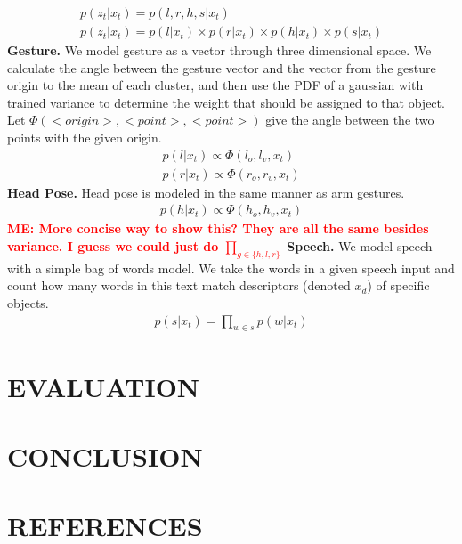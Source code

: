 \documentclass[letterpaper, 10 pt, conference]{ieeeconf}
\newcommand{\menote}[1]{\textcolor{Red}{\textbf{ME: #1}}}
\begin{document}
\begin{align}
p(z_t | x_t) = p(l, r, h, s | x_t)\\
p(z_t | x_t) = p(l | x_t) \times p(r | x_t) \times p(h | x_t) \times p(s | x_t)
\end{align}
{\bf Gesture.}  We model gesture as a vector through three dimensional space. We calculate the angle between the gesture vector and the vector from the gesture origin to the mean of each cluster, and then use the PDF of a gaussian with trained variance to determine the weight that should be assigned to that object. Let $\Phi(<origin>, <point>, <point>)$ give the angle between the two points with the given origin.
\begin{align}
p(l | x_t) \propto \Phi(l_o, l_v, x_t)\\
p(r | x_t) \propto \Phi(r_o, r_v, x_t)
\end{align}
{\bf Head Pose.}
Head pose is modeled in the same manner as arm gestures.
\begin{align}
p(h | x_t) \propto \Phi(h_o, h_v, x_t)
\end{align}
\menote{More concise way to show this? They are all the same besides variance. I guess we could just do $\prod_{g\in\{h,l,r\}}$}
{\bf Speech.}
We model speech with a simple bag of words model. We take the words in a given speech input and count how many words in this text match descriptors (denoted  $x_d$) of specific objects.
\begin{align}
p(s |x_t) = \displaystyle \prod_{w \in s} p(w | x_t)
\end{align}


\section{EVALUATION}

\section{CONCLUSION}

\section{REFERENCES}


\end{document}
